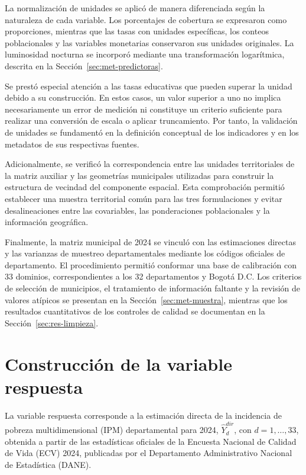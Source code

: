 La normalización de unidades se aplicó de manera diferenciada según la naturaleza de cada variable. Los porcentajes de cobertura se expresaron como proporciones, mientras que las tasas con unidades específicas, los conteos poblacionales y las variables monetarias conservaron sus unidades originales. La luminosidad nocturna se incorporó mediante una transformación logarítmica, descrita en la Sección~\ref{sec:met-predictoras}.

Se prestó especial atención a las tasas educativas que pueden superar la unidad debido a su construcción. En estos casos, un valor superior a uno no implica necesariamente un error de medición ni constituye un criterio suficiente para realizar una conversión de escala o aplicar truncamiento. Por tanto, la validación de unidades se fundamentó en la definición conceptual de los indicadores y en los metadatos de sus respectivas fuentes.

Adicionalmente, se verificó la correspondencia entre las unidades territoriales de la matriz auxiliar y las geometrías municipales utilizadas para construir la estructura de vecindad del componente espacial. Esta comprobación permitió establecer una muestra territorial común para las tres formulaciones y evitar desalineaciones entre las covariables, las ponderaciones poblacionales y la información geográfica.

Finalmente, la matriz municipal de 2024 se vinculó con las estimaciones directas y las varianzas de muestreo departamentales mediante los códigos oficiales de departamento. El procedimiento permitió conformar una base de calibración con 33 dominios, correspondientes a los 32 departamentos y Bogotá D.C. Los criterios de selección de municipios, el tratamiento de información faltante y la revisión de valores atípicos se presentan en la Sección~\ref{sec:met-muestra}, mientras que los resultados cuantitativos de los controles de calidad se documentan en la Sección~\ref{sec:res-limpieza}.

\section{Construcción de la variable respuesta}
\label{sec:met-respuesta}

La variable respuesta corresponde a la estimación directa de la incidencia de pobreza multidimensional (IPM) departamental para 2024, $\hat{Y}_d^{dir}$, con $d=1,\ldots,33$, obtenida a partir de las estadísticas oficiales de la Encuesta Nacional de Calidad de Vida (ECV) 2024, publicadas por el Departamento Administrativo Nacional de Estadística (DANE).

